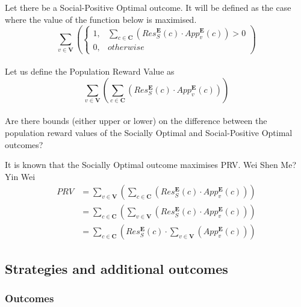 \documentclass{article}
\begin{document}
Let there be a Social-Positive Optimal outcome. It will be defined as the case where the value of the function below is maximised.
\begin{equation}
\sum^{}_{v \in \boldsymbol{V}}{\left(
\begin{cases}
1, & \sum^{}_{c \in \boldsymbol{C}}{(Res^{\boldsymbol{E}}_{S}(c) \cdot App^{\boldsymbol{E}}_{v}(c))} > 0\\
0, & {otherwise}
\end{cases}
\right)}
\end{equation}\\

Let us define the Population Reward Value as
\begin{equation}
\sum^{}_{v \in \boldsymbol{V}}{\left(
\sum^{}_{c \in \boldsymbol{C}}{\left(
Res^{\boldsymbol{E}}_{S}(c) \cdot App^{\boldsymbol{E}}_{v}(c)
\right)}
\right)}
\end{equation}\\

Are there bounds (either upper or lower) on the difference between the population reward values of the Socially Optimal and Social-Positive Optimal outcomes?

It is known that the Socially Optimal outcome maximises PRV. Wei Shen Me? Yin Wei
\begin{equation}
\begin{aligned}
PRV
&= \sum^{}_{v \in \boldsymbol{V}}{\left(\sum^{}_{c \in \boldsymbol{C}}{\left(Res^{\boldsymbol{E}}_{S}(c) \cdot App^{\boldsymbol{E}}_{v}(c)\right)}\right)}\\
&= \sum^{}_{c \in \boldsymbol{C}}{\left(\sum^{}_{v \in \boldsymbol{V}}{\left(Res^{\boldsymbol{E}}_{S}(c) \cdot App^{\boldsymbol{E}}_{v}(c)\right)}\right)}\\
&= \sum^{}_{c \in \boldsymbol{C}}{\left(Res^{\boldsymbol{E}}_{S}(c) \cdot \sum^{}_{v \in \boldsymbol{V}}{\left(App^{\boldsymbol{E}}_{v}(c)\right)}\right)}
\end{aligned}
\end{equation}


\subsection{Strategies and additional outcomes}

\subsubsection{Outcomes}
\end{document}
